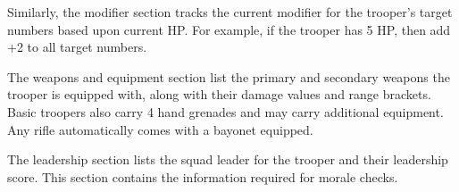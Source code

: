 Similarly, the modifier section tracks the current modifier for the trooper's target numbers based upon current HP.
For example, if the trooper has 5 HP, then add +2 to all target numbers.

The weapons and equipment section list the primary and secondary weapons the trooper is equipped with, along with their damage values and range brackets.
Basic troopers also carry 4 hand grenades and may carry additional equipment.
Any rifle automatically comes with a bayonet equipped.

The leadership section lists the squad leader for the trooper and their leadership score.
This section contains the information required for morale checks.
